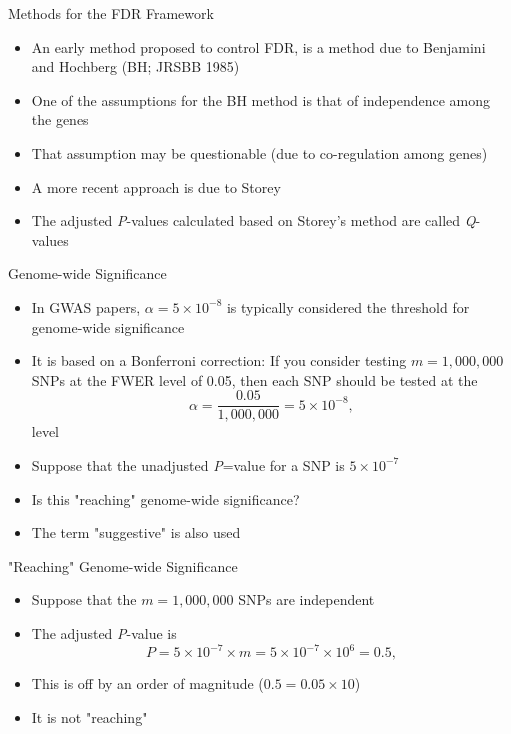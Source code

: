 \documentclass[xcolor=x11names,compress]{beamer}\usepackage[]{graphicx}\usepackage[]{color}
\begin{document}
\begin{frame}{Methods for the FDR Framework}
  \begin{itemize}
  \item An early method proposed to control FDR, is a method due to
        Benjamini and Hochberg (BH; JRSBB 1985)
  \item One of the assumptions for the BH method is that of independence
        among the genes
  \item That assumption may be questionable (due to co-regulation among genes)
  \item A more recent approach is due to Storey
  \item The adjusted {\it P}-values calculated based on Storey's method
        are called {\it Q}-values
  \end{itemize}
\end{frame}


\begin{frame}{Genome-wide Significance}
  \begin{itemize}
  \item In GWAS papers, $\alpha=5\times 10^{-8}$ is typically considered
        the threshold for genome-wide significance
  \item It is based on a Bonferroni correction: If you consider testing $m=1,000,000$
        SNPs at the FWER level of 0.05, then each SNP should be tested at the
        \begin{equation*}
          \alpha=\frac{0.05}{1,000,000} = 5\times 10^{-8},
        \end{equation*}
        level
  \item Suppose that the unadjusted {\it P}=value for a SNP is $5\times 10^{-7}$
  \item Is this "reaching" genome-wide significance?
  \item The term "suggestive" is also used
  \end{itemize}
\end{frame}

\begin{frame}{"Reaching" Genome-wide Significance}
  \begin{itemize}
  \item Suppose that the $m=1,000,000$ SNPs are independent
  \item The adjusted {\it P}-value is
     \begin{equation*}
          P=5\times 10^{-7} \times m = 5\times 10^{-7} \times 10^6 = 0.5,
        \end{equation*}
  \item This is off by an order of magnitude ($0.5=0.05 \times 10$)
  \item It is not "reaching"
  \end{itemize}
\end{frame}
\end{document}
